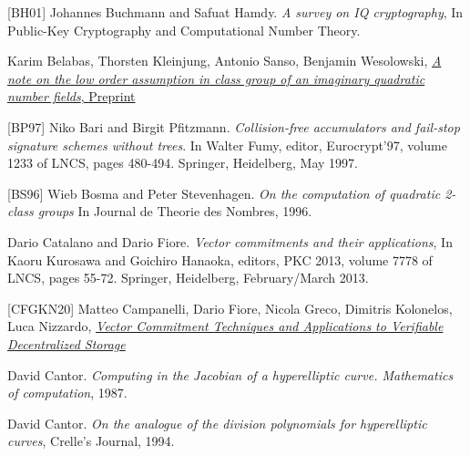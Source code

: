 \documentclass[11pt, lettersize, notitlepage, leqno, footskip=0.6cm]{article}
\newcommand{\noin}{\noindent}
\numberwithin{equation}{section}
\begin{document}
\noin \hypertarget{BH01}{[BH01]} Johannes Buchmann and Safuat Hamdy. \textit{A survey on IQ cryptography}, In Public-Key Cryptography and Computational Number Theory. \vspace{0.1cm}

\noin [BKSW20] Karim Belabas, Thorsten Kleinjung, Antonio Sanso, Benjamin Wesolowski, \href{https://eprint.iacr.org/2020/1310}{\textit{A note on the low order assumption in class group of an imaginary quadratic number fields}, Preprint} \vspace{0.1cm}

\noin \hypertarget{BP97}{[BP97]} Niko Bari and Birgit Pfitzmann. \textit{Collision-free accumulators and fail-stop signature schemes without trees}. In Walter Fumy, editor, Eurocrypt'97, volume 1233 of LNCS, pages 480-494. Springer, Heidelberg, May 1997. \vspace{0.1cm}

\noin \hypertarget{BS96}{[BS96]} Wieb Bosma and Peter Stevenhagen. \textit{On the computation of quadratic 2-class groups} In Journal de Theorie des Nombres, 1996. \vspace{0.1cm}

\noin [CF13] Dario Catalano and Dario Fiore. \textit{Vector commitments and their applications}, In Kaoru Kurosawa and Goichiro Hanaoka, editors, PKC 2013, volume 7778 of LNCS, pages 55-72. Springer, Heidelberg, February/March 2013. \vspace{0.1cm}

\noin \hypertarget{CFGKN20}{[CFGKN20]} Matteo Campanelli, Dario Fiore, Nicola Greco, Dimitris Kolonelos, Luca Nizzardo, \href{https://eprint.iacr.org/2020/149}{\textit{Vector Commitment Techniques and Applications to Verifiable Decentralized Storage}} \vspace{0.1cm}


\noin [Can87] David Cantor. \textit{Computing in the Jacobian of a hyperelliptic curve. Mathematics of computation}, 1987.\vspace{0.1cm}

\noin [Can94] David Cantor. \textit{On the analogue of the division polynomials for hyperelliptic curves}, Crelle's Journal, 1994.\vspace{0.1cm}
\end{document}
